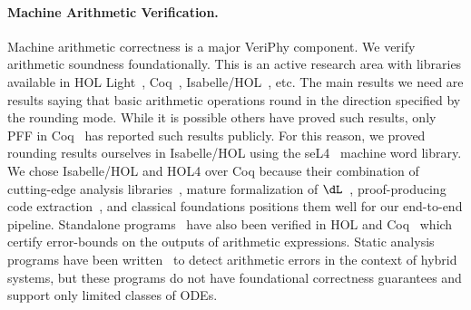 \documentclass[12pt]{cmuthesis}
\theoremstyle{definition}
\theoremstyle{remark}
\newcommand{\Isabelle}{Isabelle/HOL\xspace}
\newcommand{\VeriPhy}{VeriPhy\xspace}
\begin{document}
\paragraph{Machine Arithmetic Verification.}
Machine arithmetic correctness is a major \VeriPhy component.
We verify arithmetic soundness foundationally.
This is an active research area with libraries available in HOL Light~\cite{DBLP:conf/sfm/Harrison06}, Coq~\cite{DBLP:conf/arith/BoldoM10,DBLP:conf/tphol/DaumasRT01,DBLP:conf/mkm/BoldoFM09,DBLP:journals/iandc/Melquiond12}, \Isabelle~\cite{DBLP:journals/afp/Yu13}, etc.
The main results we need are results saying that basic arithmetic operations round in the direction specified by the rounding mode.
While it is possible others have proved such results, only PFF in Coq~\cite{DBLP:conf/tphol/DaumasRT01} has reported such results publicly.
For this reason, we proved rounding results ourselves in \Isabelle using the seL4~\cite{DBLP:journals/cacm/KleinAEHCDEEKNSTW10} machine word library.
We chose \Isabelle and HOL4 over Coq because their combination of cutting-edge analysis libraries~\cite{DBLP:conf/itp/ImmlerT16}, mature formalization of $\dL$~\cite{DBLP:conf/cpp/BohrerRVVP17}, proof-producing code extraction~\cite{DBLP:conf/icfp/MyreenO12}, and classical foundations positions them well for our end-to-end pipeline.
Standalone programs~\cite{DBLP:conf/tacas/2018-1} have also been verified in HOL and Coq~\cite{DBLP:conf/fmcad/BeckerZMDMF18} which certify error-bounds on the outputs of arithmetic expressions.
Static analysis programs have been written~\cite{DBLP:conf/emsoft/MartinezMST10,DBLP:conf/emsoft/MajumdarSZ12,DBLP:conf/cav/BouissouGPTV09} to detect arithmetic errors in the context of hybrid systems, but these programs do not have foundational correctness guarantees and support only limited classes of ODEs.
\end{document}
